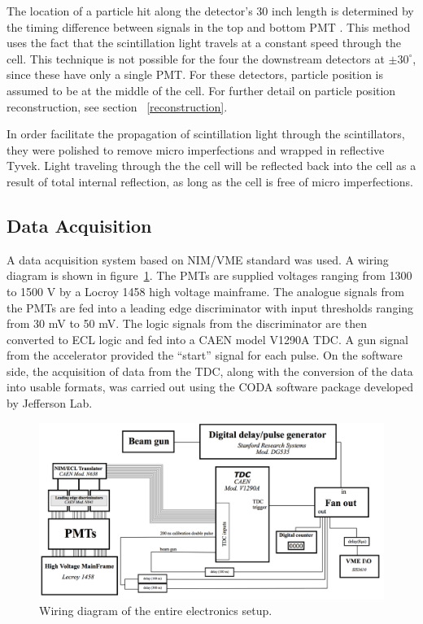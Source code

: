 The location of a particle hit along the detector's 30 inch length is determined by the timing difference between signals in the top and bottom PMT .
This method uses the fact that the scintillation light travels at a constant speed through the cell.
This technique is not possible for the four the downstream detectors at $\pm 30^{\circ}$, since these have only a single PMT.
For these detectors, particle position is assumed to be at the middle of the cell.
For further detail on particle position reconstruction, see section ~\ref{reconstruction}.

In order facilitate the propagation of scintillation light through the scintillators, they were polished to remove micro imperfections and wrapped in reflective Tyvek.
Light traveling through the the cell will be reflected back into the cell as a result of total internal reflection, as long as the cell is free of micro imperfections. 

\subsection{Data Acquisition}
A data acquisition system based on NIM/VME standard was used.
A wiring diagram is shown in figure~\ref{fig:WiringDiagram}.
The PMTs are supplied voltages ranging from 1300 to 1500 V by a Locroy 1458 high voltage mainframe.
The analogue signals from the PMTs are fed into a leading edge discriminator with input thresholds ranging from 30 mV to 50 mV.
The logic signals from the discriminator are then converted to ECL logic and fed into a CAEN model V1290A TDC.
A gun signal from the accelerator provided the “start” signal for each pulse.
On the software side, the acquisition of data from the TDC, along with the conversion of the data into usable formats, was carried out using the CODA software package developed by Jefferson Lab.  

\begin{figure}[h]
\includegraphics[width=\textwidth]{Content/Methods/WiringDiagram.png}
\caption{Wiring diagram of the entire electronics setup. }
\label{fig:WiringDiagram}
\end{figure}
